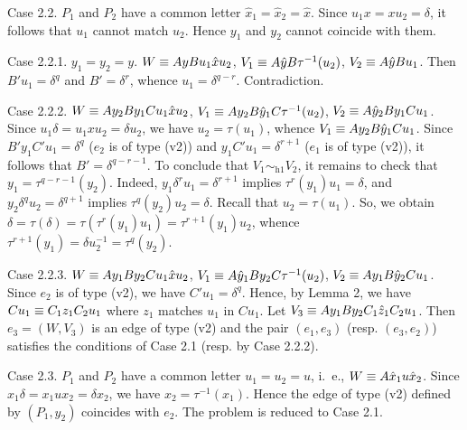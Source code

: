 Case 2.2. $P_1$ and $P_2$ have a common letter $\hat x_1=\hat x_2=\hat x$.
Since $u_1x=xu_2=\delta$, it follows that $u_1$ cannot match $u_2$.
Hence $y_1$ and $y_2$ cannot coincide with them.

Case 2.2.1. $y_1=y_2=y$. $W\equiv AyBu_1\hat x u_2$,
$V_1\equiv A\hat y B\tau^{-1}(u_2)$, $V_2\equiv A\hat yB u_1$.
Then $B'u_1=\delta^q$ and $B'=\delta^r$, whence $u_1=\delta^{q-r}$. Contradiction.

Case 2.2.2. $W\equiv Ay_2By_1Cu_1\hat x u_2$,
$V_1\equiv A y_2 B \hat y_1 C \tau^{-1}(u_2)$,
$V_2\equiv A\hat y_2 B y_1 C u_1$.
Since $u_1\delta=u_1xu_2=\delta u_2$, we have $u_2=\tau(u_1)$,
whence $V_1\equiv A y_2 B \hat y_1 C u_1$.
Since $B'y_1C'u_1=\delta^q$ ($e_2$ is of type (v2)) and $y_1C'u_1=\delta^{r+1}$
($e_1$ is of type (v2)), it follows that $B'=\delta^{q-r-1}$.
To conclude that $V_1\sim_{\text{h1}}V_2$, it remains to check that
$y_1=\tau^{q-r-1}(y_2)$. Indeed, $y_1\delta^r u_1=\delta^{r+1}$
implies $\tau^r(y_1)u_1=\delta$, and  $y_2\delta^q u_2=\delta^{q+1}$
implies $\tau^q(y_2)u_2=\delta$. Recall that $u_2=\tau(u_1)$. So, we obtain
$\delta=\tau(\delta)=\tau(\tau^r(y_1)u_1)%
=\tau^{r+1}(y_1)u_2$,
whence $\tau^{r+1}(y_1)=\delta u_2^{-1}=\tau^q(y_2)$.

Case 2.2.3. $W\equiv Ay_1By_2Cu_1\hat x u_2$,
$V_1\equiv A\hat y_1 B y_2 C \tau^{-1}(u_2)$,
$V_2\equiv A y_1 B\hat y_2 C u_1$.
Since $e_2$ is of type (v2), we have $C'u_1=\delta^q$.
Hence, by Lemma 2, we have $Cu_1\equiv C_1z_1C_2u_1$
where $z_1$ matches $u_1$ in $Cu_1$.
Let $V_3\equiv A y_1 B y_2 C_1 \hat z_1 C_2 u_1$.
Then $e_3=(W,V_3)$ is an edge of type (v2) and the pair $(e_1,e_3)$ (resp. $(e_3,e_2)$)
satisfies the conditions of Case 2.1 (resp. by Case 2.2.2).

Case 2.3. $P_1$ and $P_2$ have a common letter $u_1=u_2=u$,
i.~e., $W\equiv A\hat x_1u\hat x_2$. Since $x_1\delta=x_1 u x_2=\delta x_2$,
we have $x_2=\tau^{-1}(x_1)$. Hence
the edge of type (v2) defined by $(P_1,y_2)$ coincides with $e_2$.
The problem is reduced to Case 2.1.

